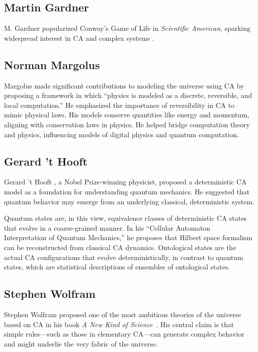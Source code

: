 \documentclass[12pt]{article}
\begin{document}
\subsection*{Martin Gardner}
M. Gardner popularized Conway’s Game of Life in \emph{Scientific American}, sparking widespread interest in CA and complex systems \cite{gardner1970}.

\subsection*{Norman Margolus}
Margolus \cite{margolus} made significant contributions to modeling the universe using CA by proposing a framework in which ``physics is modeled as a discrete, reversible, and local computation.'' He emphasized the importance of reversibility in CA to mimic physical laws. His models conserve quantities like energy and momentum, aligning with conservation laws in physics. He helped bridge computation theory and physics, influencing models of digital physics and quantum computation.

\subsection*{Gerard 't Hooft}
Gerard 't Hooft \cite{thooft}, a Nobel Prize-winning physicist, proposed a deterministic CA model as a foundation for understanding quantum mechanics. He suggested that quantum behavior may emerge from an underlying classical, deterministic system.

Quantum states are, in this view, equivalence classes of deterministic CA states that evolve in a coarse-grained manner. In his ``Cellular Automaton Interpretation of Quantum Mechanics,'' he proposes that Hilbert space formalism can be reconstructed from classical CA dynamics. Ontological states are the actual CA configurations that evolve deterministically, in contrast to quantum states, which are statistical descriptions of ensembles of ontological states.

\subsection*{Stephen Wolfram}
Stephen Wolfram proposed one of the most ambitious theories of the universe based on CA in his book \emph{A New Kind of Science}~\cite{wolfram}. His central claim is that simple rules—such as those in elementary CA—can generate complex behavior and might underlie the very fabric of the universe.
\end{document}
